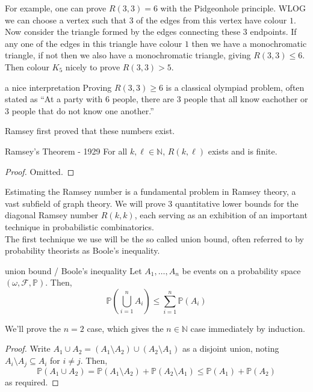 \documentclass{article}
\begin{document}
For example, one can prove $R(3,3) = 6$ with the Pidgeonhole principle. WLOG we can choose a vertex such that 
$3$ of the edges from this vertex have colour $1$. Now consider the triangle formed by the edges connecting these $3$
endpoints. If any one of the edges in this triangle have colour $1$ then we have a monochromatic triangle, if not 
then we also have a monochromatic triangle, giving $R(3,3) \leq 6$. Then colour $K_5$ nicely to prove $R(3,3) > 5$. 

\begin{remark}[]{a nice interpretation}
    Proving $R(3,3) \geq 6$ is a classical olympiad problem, often stated as ``At a party with 
    $6$ people, there are $3$ people that all know eachother or $3$ people that do not know one another.'' 
\end{remark}

Ramsey first proved that these numbers exist. 

\begin{theorem}[]{Ramsey's Theorem - 1929}
    For all $k, \ell \in \mathbb{N}$, $R(k, \ell)$ exists and is finite. 
\end{theorem}

\begin{proof}
    Omitted. 
\end{proof}

Estimating the Ramsey number is a fundamental problem in Ramsey theory, a vast subfield of graph theory. We 
will prove 3 quantitative lower bounds for the diagonal Ramsey number $R(k, k)$, each serving as an exhibition 
of an important technique in probabilistic combinatorics. \\ 

The first technique we use will be the so called union bound, often referred to by probability theorists as 
Boole's inequality. 

\begin{lemma}[]{union bound / Boole's inequality}
    Let $A_1, \dots, A_n$ be events on a probability space $(\omega, \mathcal{F}, \mathbb{P})$. Then, 
    \[\mathbb{P}\left(\bigcup_{i = 1}^n A_i\right) \leq \sum_{i = 1}^n \mathbb{P}(A_i)\]
\end{lemma}

We'll prove the $n=2$ case, which gives the $n \in \mathbb{N}$ case immediately by induction. 

\begin{proof}
    Write $A_1 \cup A_2 = (A_1 \setminus A_2) \cup (A_2 \setminus A_1)$ as a disjoint union, noting $A_i \setminus A_j 
    \subseteq A_i$ for $i \neq j$. Then,
    \[\mathbb{P}(A_1 \cup A_2) = \mathbb{P}(A_1 \setminus A_2) + \mathbb{P}(A_2 \setminus A_1) 
    \leq \mathbb{P}(A_1) + \mathbb{P}(A_2)\] as required.
\end{proof}
\end{document}
